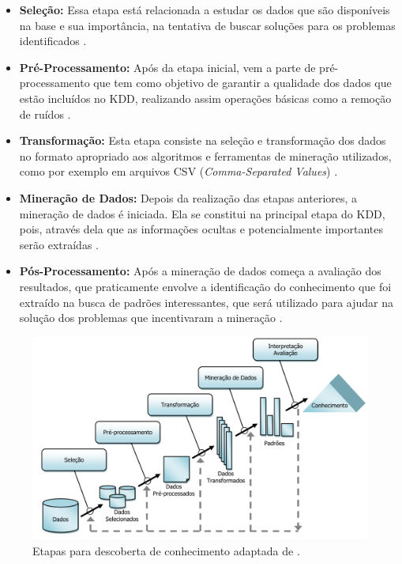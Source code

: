 \begin{itemize}
    \item \textbf{Seleção:} Essa etapa está relacionada a estudar os dados que são disponíveis na base e sua importância, na tentativa de buscar soluções para os problemas identificados \cite{Kampff2013}.
    \item \textbf{Pré-Processamento:} Após da etapa inicial, vem a parte de pré-processamento que tem como objetivo de garantir a qualidade dos dados que estão incluídos no KDD, realizando assim operações básicas como a remoção de ruídos \cite{Dantas2008}.
    \item \textbf{Transformação:} Esta etapa consiste na seleção e transformação dos dados no formato apropriado aos algoritmos e ferramentas de mineração utilizados, como por exemplo em arquivos CSV (\textit{Comma-Separated Values}) \cite{Kampff2013}.
    \item \textbf{Mineração de Dados:} Depois da realização das etapas anteriores, a mineração de dados é iniciada. Ela se constitui na principal etapa do KDD, pois, através dela que as informações ocultas e potencialmente importantes serão extraídas \cite{Kampff2013}. 
    \item \textbf{Pós-Processamento:} Após a mineração de dados começa a avaliação dos resultados, que praticamente envolve a identificação do conhecimento que foi extraído na busca de padrões interessantes, que será utilizado para ajudar na solução dos problemas que incentivaram a mineração \cite{Dantas2008}.
\end{itemize}

\begin{figure}[!htp]
	\begin{center}
    \caption{\label{fig:waveform_fig}Etapas para descoberta de conhecimento adaptada de \cite{Fayyad1996}.}
	\includegraphics[scale=0.55]{Figuras/Etapas_KDD.png}
	\end{center}
\end{figure}

